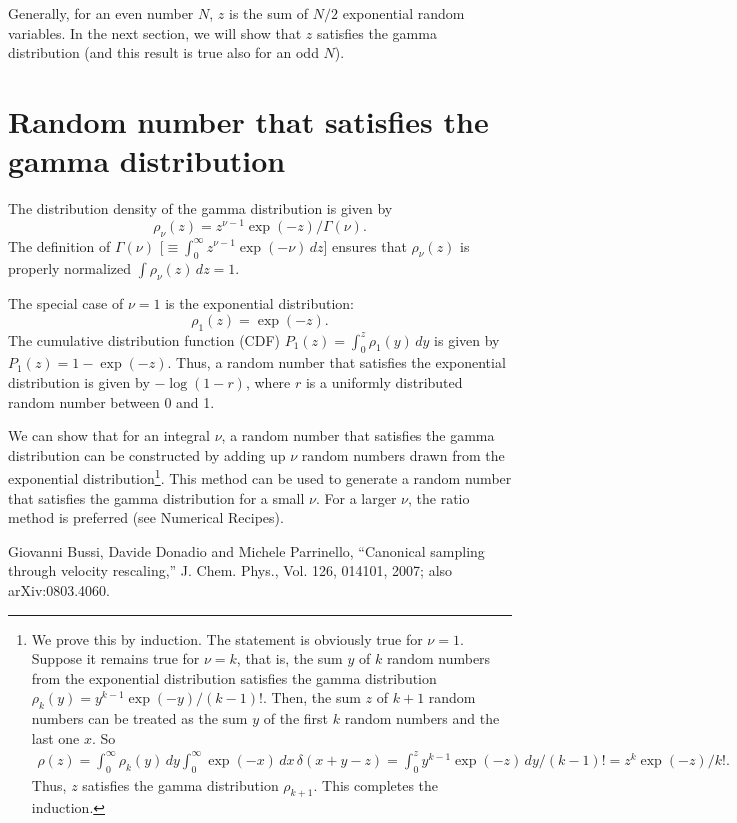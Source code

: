\documentclass[11pt]{article}
\begin{document}
Generally, for an even number $N$,
$z$ is the sum of $N/2$ exponential random variables.
%
In the next section,
we will show that $z$
satisfies the gamma distribution
%
(and this result is true also for an odd $N$).



\section{Random number that satisfies the gamma distribution}



The distribution density of the gamma distribution is given by
\begin{equation}
  \rho_\nu(z) = z^{\nu - 1} \exp(-z) / \Gamma(\nu).
\end{equation}
The definition of $\Gamma(\nu)$
$\bigl[ \equiv \int_0^\infty z^{\nu - 1} \exp(-\nu) \, dz \bigr]$
ensures that $\rho_\nu(z)$ is properly normalized
$\int \rho_\nu(z) \, dz = 1$.

The special case of $\nu = 1$ is the exponential distribution:
\begin{equation}
  \rho_1(z) = \exp(-z).
\end{equation}
The cumulative distribution function (CDF)
$P_1(z) = \int_0^z \rho_1(y) \, dy$
is given by
$P_1(z) = 1 - \exp(-z)$.
Thus, a random number that satisfies the exponential distribution
is given by $-\log(1 - r)$,
where $r$ is a uniformly distributed random number between 0 and 1.

We can show that for an integral $\nu$,
a random number that satisfies the gamma distribution
can be constructed by adding up $\nu$ random numbers
drawn from the exponential distribution\footnote{
%
%
%
We prove this by induction.
The statement is obviously true for $\nu = 1$.
%
Suppose it remains true for $\nu = k$,
that is,
the sum $y$ of $k$ random numbers
from the exponential distribution
satisfies the gamma distribution
$\rho_k(y) = y^{k - 1} \exp(-y) / (k-1)!$.
%
Then, the sum $z$ of $k+1$ random numbers
can be treated as the sum $y$ of the first $k$ random numbers
and the last one $x$.
%
So
\begin{align*}
  \rho(z)
= \int_0^\infty \rho_k(y) \, dy \int_0^\infty \exp(-x) \, dx \, \delta(x + y - z)
= \int_0^z y^{k - 1} \exp(-z) \, dy / (k-1)! = z^k \exp(-z) / k!.
\end{align*}
%
Thus, $z$ satisfies the gamma distribution $\rho_{k+1}$.
This completes the induction.
%
%
%
}.
This method can be used to generate a random number
that satisfies the gamma distribution for a small $\nu$.
For a larger $\nu$, the ratio method is preferred
(see Numerical Recipes).



\begin{thebibliography}{100}

  Giovanni Bussi, Davide Donadio and Michele Parrinello,
  ``Canonical sampling through velocity rescaling,''
  J. Chem. Phys., Vol. 126, 014101,
  2007;
  also arXiv:0803.4060.

\end{thebibliography}
\end{document}
